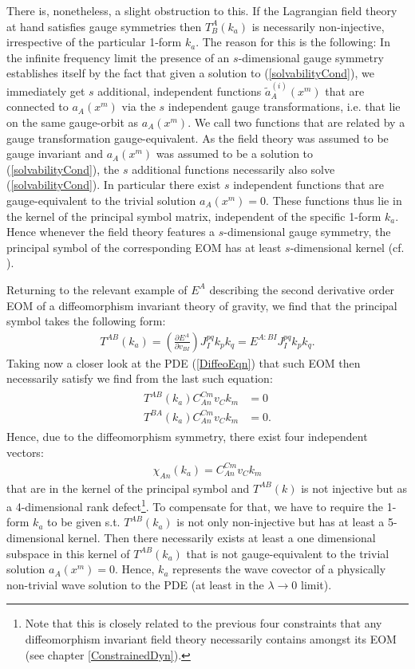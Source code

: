 There is, nonetheless, a slight obstruction to this. If the Lagrangian field theory at hand satisfies gauge symmetries then $T^A_B(k_a)$ is necessarily non-injective, irrespective of the particular 1-form $k_a$. The reason for this is the following: In the infinite frequency limit the presence of an $s$-dimensional gauge symmetry establishes itself by the fact that given a solution to (\ref{solvabilityCond}), we immediately get $s$ additional, independent functions $\tilde{a}^{(i)}_A(x^m)$ that are connected to $a_A(x^m)$ via the $s$ independent gauge transformations, i.e. that lie on the same gauge-orbit as $a_A(x^m)$. We call two functions that are related by a gauge transformation gauge-equivalent. As the field theory was assumed to be gauge invariant and $a_A(x^m)$ was assumed to be a solution to (\ref{solvabilityCond}), the $s$ additional functions necessarily also solve (\ref{solvabilityCond}). In particular there exist $s$ independent functions that are gauge-equivalent to the trivial solution $a_A(x^m) = 0$.    
These functions thus lie in the kernel of the principal symbol matrix, independent of the specific 1-form $k_a$.
Hence whenever the field theory features a $s$-dimensional gauge symmetry, the principal symbol of the corresponding EOM has at least $s$-dimensional kernel (cf. \cite{2018PhRvD..97h4036D}). 

Returning to the relevant example of $E^A$ describing the second derivative order EOM of a diffeomorphism invariant theory of gravity, we find that the principal symbol takes the following form:
\begin{align}
    T^{A B} (k_a) = \left (\frac{\partial E^A}{\partial v_{BI}} \right )J_I^{pq} k_p k_q = E^{A: BI} J_I^{pq} k_p k_q.
\end{align}
Taking now a closer look at the PDE (\ref{DiffeoEqn}) that such EOM then necessarily  satisfy we find from the last such equation:
\begin{align}\label{symbolDef}
\begin{aligned}
    T^{A B} (k_a) C_{An}^{Cm}v_Ck_m &= 0 \\
    T^{B A} (k_a) C_{An}^{Cm}v_Ck_m &= 0 .
\end{aligned}
\end{align}
Hence, due to the diffeomorphism symmetry, there exist four independent vectors:
\begin{align}
   \chi_{An}(k_a) =  C_{An}^{Cm}v_Ck_m
\end{align} that are in the kernel of the principal symbol and $T^{AB}(k)$ is not injective but as a 4-dimensional rank defect\footnote{Note that this is closely related to the previous four constraints that any diffeomorphism invariant field theory necessarily contains amongst its EOM (see chapter \ref{ConstrainedDyn}).}. To compensate for that, we have to require the 1-form $k_a$ to be given s.t. $T^{AB}(k_a)$ is not only non-injective but has at least a 5-dimensional kernel. Then there necessarily exists at least a one dimensional subspace in this kernel of $T^{AB}(k_a)$ that is not gauge-equivalent to the trivial solution $a_A(x^m) = 0$. Hence, $k_a$ represents the wave covector of a physically non-trivial wave solution to the PDE (at least in the $\lambda \rightarrow 0$ limit).

